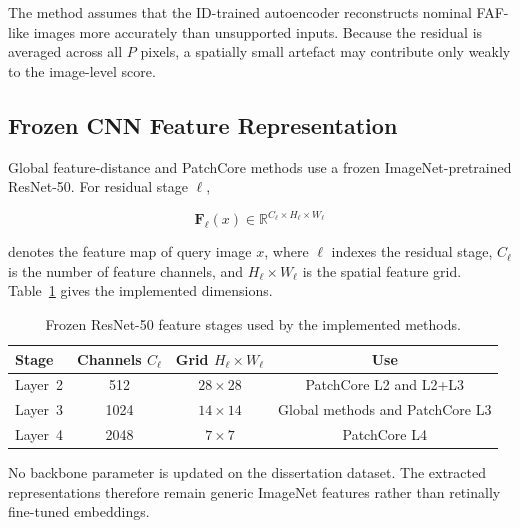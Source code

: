 \documentclass[fleqn,12pt]{olplainarticle}
\begin{document}
The method assumes that the ID-trained autoencoder reconstructs nominal
FAF-like images more accurately than unsupported inputs. Because the residual
is averaged across all $P$ pixels, a spatially small artefact may contribute
only weakly to the image-level score.

\subsection{Frozen CNN Feature Representation}
\label{subsec:feature_representation}

Global feature-distance and PatchCore methods use a frozen ImageNet-pretrained
ResNet-50. For residual stage $\ell$,

\begin{equation}
    \mathbf{F}_{\ell}(x)
    \in
    \mathbb{R}^{C_{\ell}\times H_{\ell}\times W_{\ell}}
    \label{eq:method_feature_map}
\end{equation}

denotes the feature map of query image $x$, where $\ell$ indexes the residual
stage, $C_{\ell}$ is the number of feature channels, and
$H_{\ell}\times W_{\ell}$ is the spatial feature grid.
Table~\ref{tab:resnet_feature_dimensions} gives the implemented dimensions.

\begin{table}[htbp]
    \centering
    \caption[ResNet-50 stages used by the implemented methods.]{Frozen
    ResNet-50 feature stages used by the implemented methods.}
    \label{tab:resnet_feature_dimensions}

    \small
    \setlength{\tabcolsep}{8pt}
    \renewcommand{\arraystretch}{1.08}

    \begin{tabular}{@{}lccc@{}}
        \toprule
        \textbf{Stage} &
        \textbf{Channels $C_{\ell}$} &
        \textbf{Grid $H_{\ell}\times W_{\ell}$} &
        \textbf{Use} \\
        \midrule
        Layer~2 & 512  & $28\times28$ & PatchCore L2 and L2+L3 \\
        Layer~3 & 1024 & $14\times14$ & Global methods and PatchCore L3 \\
        Layer~4 & 2048 & $7\times7$   & PatchCore L4 \\
        \bottomrule
    \end{tabular}
\end{table}

No backbone parameter is updated on the dissertation dataset. The extracted
representations therefore remain generic ImageNet features rather than
retinally fine-tuned embeddings.
\end{document}
